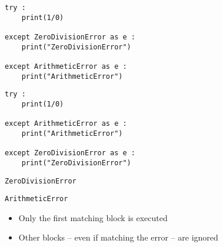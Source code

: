 \begin{frame}[fragile]
%
\begin{tcbraster}[raster columns=2,
                  raster equal height,
                  nobeforeafter,
                  raster column skip=0.5cm]
\begin{codebox}
\begin{verbatim}
try :
    print(1/0)
    
except ZeroDivisionError as e :
    print("ZeroDivisionError")
    
except ArithmeticError as e :
    print("ArithmeticError")
\end{verbatim}
\end{codebox}
%
\begin{codebox}
\begin{verbatim}
try :
    print(1/0)
    
except ArithmeticError as e :
    print("ArithmeticError")
    
except ZeroDivisionError as e :
    print("ZeroDivisionError")
\end{verbatim}
\end{codebox}
\end{tcbraster}
%
\begin{tcbraster}[raster columns=2,
                  raster equal height,
                  nobeforeafter,
                  raster column skip=0.5cm]
\begin{cmdbox}
\begin{verbatim}
ZeroDivisionError
\end{verbatim}
\end{cmdbox}
%
\begin{cmdbox}
\begin{verbatim}
ArithmeticError
\end{verbatim}
\end{cmdbox}
\end{tcbraster}
%
\begin{itemize}
\item[\Thus] Only the first matching block is executed
\item[\Thus] Other  blocks -- even if matching the error -- are ignored
\end{itemize}
%
\end{frame}

